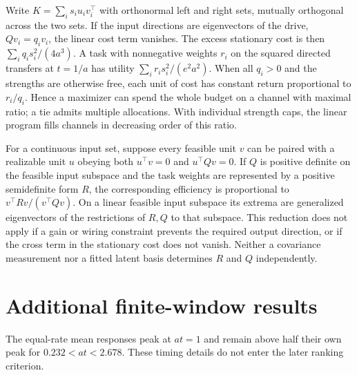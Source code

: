 \documentclass[aps,10pt,onecolumn,superscriptaddress,nofootinbib,
  longbibliography,amsmath,amssymb,floatfix]{revtex4-2}
\begin{document}
Write \(K=\sum_i s_i u_i v_i^\top\) with orthonormal left and right
sets, mutually orthogonal across the two sets. If the input directions
are eigenvectors of the drive, \(Qv_i=q_i v_i\), the linear cost term
vanishes. The excess stationary cost is then
\(\sum_i q_i s_i^2/(4a^3)\). A task with nonnegative weights \(r_i\)
on the squared directed transfers at \(t=1/a\) has utility
\(\sum_i r_i s_i^2/(e^2a^2)\). When all \(q_i>0\) and the strengths are
otherwise free, each unit of cost has constant return proportional to
\(r_i/q_i\). Hence a maximizer can spend the whole budget on a channel
with maximal ratio; a tie admits multiple allocations. With individual
strength caps, the linear program fills channels in decreasing order
of this ratio.

For a continuous input set, suppose every feasible unit \(v\) can be
paired with a realizable unit \(u\) obeying both \(u^\top v=0\) and
\(u^\top Qv=0\). If \(Q\) is positive definite on the feasible input
subspace and the task weights are represented by a positive
semidefinite form \(R\), the corresponding efficiency is proportional
to \(v^\top Rv/(v^\top Qv)\). On a linear feasible input subspace its
extrema are generalized eigenvectors of the restrictions of \(R,Q\)
to that subspace. This reduction does not apply if a gain or wiring
constraint prevents the required output direction, or if the cross term
in the stationary cost does not vanish. Neither a covariance
measurement nor a fitted latent basis determines \(R\) and \(Q\)
independently.

\section{Additional finite-window results}
The equal-rate mean responses peak at \(at=1\) and remain above
half their own peak for \(0.232<at<2.678\). These timing details
do not enter the later ranking criterion.
\label{sec:windows}
\end{document}
